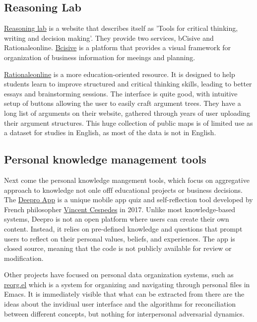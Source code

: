 \documentclass{article}
\begin{document}
\subsection{Reasoning Lab}
\href{https://www.reasoninglab.com/argument-mapping/}{Reasoning lab} is a website that describes itself as 'Tools for critical thinking, writing and decision making'. They provide two services, bCisive and Rationaleonline.
\href{https://www.reasoninglab.com/bcisive-2/}{Bcisive} is a platform that provides a visual framework for organization of business information for meeings and planning.

\href{https://www.rationaleonline.com/browse/all}{Rationaleonline} is a more education-oriented resource. It is designed to help students learn to improve structured and critical thinking skills, leading to better essays and brainstorming sessions.
The interface is quite good, with intuitive setup of buttons allowing the user to easily craft argument trees.
They have a long list of arguments on their website, gathered through years of user uploading their argument structures.
This huge collection of public maps is of limited use as a dataset for studies in English, as most of the data is not in English.

\subsection{Personal knowledge management tools}
Next come the personal knowledge mangement tools, which focus on aggregative approach to knowledge not onle offf educational projects or business decisions.
The \href{https://play.google.com/store/apps/details?id=fr.deepro.app&hl=en_US}{Deepro App} is a unique mobile app quiz and self-reflection tool developed by French philosopher \href{https://en.wikipedia.org/wiki/Vincent_Cespedes}{Vincent Cespedes} in 2017. Unlike most knowledge-based systems, Deepro is not an open platform where users can create their own content. Instead, it relies on pre-defined knowledge and questions that prompt users to reflect on their personal values, beliefs, and experiences. The app is closed source, meaning that the code is not publicly available for review or modification.

Other projects have focused on personal data organization systems, such as \href{https://github.com/senters/reorg.el}{reorg.el} which is a system for organizing and navigating through personal files in Emacs. It is immediately visible that what can be extracted from there are the ideas about the invidiual user interface and the algorithms for reconciliation between different concepts, but nothing for interpersonal adversarial dynamics.
\end{document}

